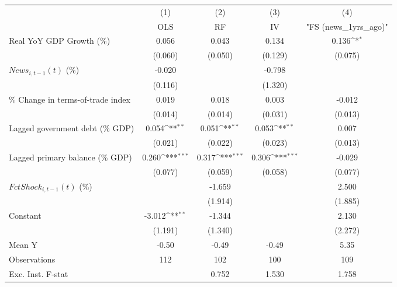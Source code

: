 {
\def\sym#1{\ifmmode^{#1}\else\(^{#1}\)\fi}
\begin{tabular}{l*{4}{c}}
\toprule
                    &\multicolumn{1}{c}{(1)}&\multicolumn{1}{c}{(2)}&\multicolumn{1}{c}{(3)}&\multicolumn{1}{c}{(4)}\\
                    &\multicolumn{1}{c}{OLS}&\multicolumn{1}{c}{RF}&\multicolumn{1}{c}{IV}&\multicolumn{1}{c}{ "FS (news_1yrs_ago)" }\\
\midrule
Real YoY GDP Growth (\%)&       0.056         &       0.043         &       0.134         &       0.136\sym{*}  \\
                    &     (0.060)         &     (0.050)         &     (0.129)         &     (0.075)         \\
\addlinespace
$ News_{i,t-1}(t)$ (\%)&      -0.020         &                     &      -0.798         &                     \\
                    &     (0.116)         &                     &     (1.320)         &                     \\
\addlinespace
\% Change in terms-of-trade index&       0.019         &       0.018         &       0.003         &      -0.012         \\
                    &     (0.014)         &     (0.014)         &     (0.031)         &     (0.013)         \\
\addlinespace
Lagged government debt (\% GDP)&       0.054\sym{**} &       0.051\sym{**} &       0.053\sym{**} &       0.007         \\
                    &     (0.021)         &     (0.022)         &     (0.023)         &     (0.013)         \\
\addlinespace
Lagged primary balance (\% GDP)&       0.260\sym{***}&       0.317\sym{***}&       0.306\sym{***}&      -0.029         \\
                    &     (0.077)         &     (0.059)         &     (0.058)         &     (0.077)         \\
\addlinespace
$ FctShock_{i,t-1}(t)$ (\%)&                     &      -1.659         &                     &       2.500         \\
                    &                     &     (1.914)         &                     &     (1.885)         \\
\addlinespace
Constant            &      -3.012\sym{**} &      -1.344         &                     &       2.130         \\
                    &     (1.191)         &     (1.340)         &                     &     (2.272)         \\
\midrule
Mean Y              &       -0.50         &       -0.49         &       -0.49         &        5.35         \\
Observations        &         112         &         102         &         100         &         109         \\
Exc. Inst. F-stat   &                     &       0.752         &       1.530         &       1.758         \\
\bottomrule
\end{tabular}
}
